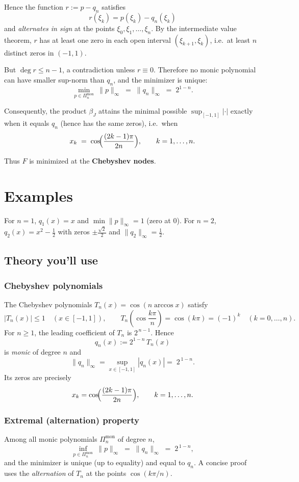 \documentclass[12pt,a4paper]{article}
\theoremstyle{plain}
\theoremstyle{definition}
\theoremstyle{remark}
\theoremstyle{remark}
\begin{document}
\smallskip

Hence the function $r:=p-q_n$ satisfies
\[
r(\xi_k)=p(\xi_k)-q_n(\xi_k)
\]
and \emph{alternates in sign} at the points $\xi_0,\xi_1,\dots,\xi_n$.
By the intermediate value theorem, $r$ has at least one zero in each open interval
$(\xi_{k+1},\xi_k)$, i.e.\ at least $n$ distinct zeros in $(-1,1)$.

\smallskip

But $\deg r\le n-1$, a contradiction unless $r\equiv 0$.
Therefore no monic polynomial can have smaller sup-norm than $q_n$, and the minimizer is unique:
\[
\min_{p\in\Pi_n^{\mathrm{mon}}}\ \|p\|_\infty \;=\; \|q_n\|_\infty \;=\; 2^{1-n}.
\]

\smallskip

Consequently, the product $\beta_J$ attains the minimal possible
$\sup_{[-1,1]}|\cdot|$ exactly when it equals $q_n$ (hence has the same zeros), i.e.\ when
\[
x_k \;=\; \cos\!\Bigl(\frac{(2k-1)\pi}{2n}\Bigr),
\qquad k=1,\dots,n.
\]

Thus $F$ is minimized at the \textbf{Chebyshev nodes}.

\smallskip

\section*{Examples}
For $n=1$, $q_1(x)=x$ and $\min\|p\|_\infty=1$ (zero at $0$).  
For $n=2$, $q_2(x)=x^2-\tfrac12$ with zeros $\pm\frac{\sqrt2}{2}$ and $\|q_2\|_\infty=\tfrac12$.

	
\subsection*{Theory you’ll use}

\subsubsection*{Chebyshev polynomials}
The Chebyshev polynomials $T_n(x)=\cos(n\arccos x)$ satisfy
\[
|T_n(x)|\le 1 \quad (x\in[-1,1]), 
\qquad
T_n\!\left(\cos\!\frac{k\pi}{n}\right)=\cos(k\pi)=(-1)^k\quad (k=0,\dots,n).
\]
For $n\ge 1$, the leading coefficient of $T_n$ is $2^{\,n-1}$. Hence
\[
q_n(x):=2^{1-n}\,T_n(x)
\]
is \emph{monic} of degree $n$ and
\[
\|q_n\|_\infty=\sup_{x\in[-1,1]}|q_n(x)|=\;2^{\,1-n}.
\]
Its zeros are precisely
\[
x_k=\cos\!\Bigl(\frac{(2k-1)\pi}{2n}\Bigr), \qquad k=1,\dots,n.
\]

\subsubsection*{Extremal (alternation) property}
Among all monic polynomials $\Pi^{\mathrm{mon}}_n$ of degree $n$,
\[
\inf_{p\in\Pi^{\mathrm{mon}}_n}\ \|p\|_\infty
\;=\; \|q_n\|_\infty \;=\; 2^{\,1-n},
\]
and the minimizer is unique (up to equality) and equal to $q_n$.
A concise proof uses the \emph{alternation} of $T_n$ at the points $\cos(k\pi/n)$.	
	
\end{document}
